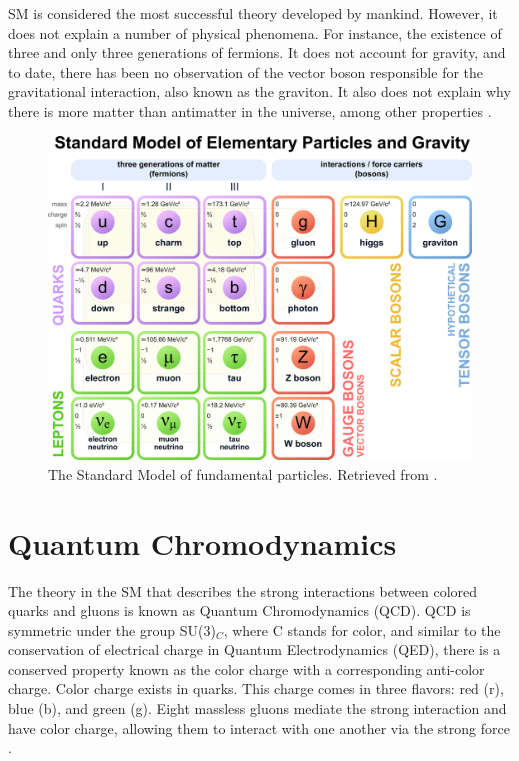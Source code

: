 SM is considered the most successful theory developed by mankind. However, it does not explain a number of physical phenomena. For instance, the existence of three and only three generations of fermions. It does not account for gravity, and to date, there has been no observation of the vector boson responsible for the gravitational interaction, also known as the graviton. It also does not explain why there is more matter than antimatter in the universe, among other properties \cite{grummer2021search, danilov2020measurement}.
\begin{figure}[htp!]
	\centering
	\includegraphics[scale=0.34]{MainContent/Figs/SM.eps}
	\caption{The Standard Model of fundamental particles. Retrieved from \cite{danilov2020measurement}.}
	\label{fig:sm}
\end{figure}

\section{Quantum Chromodynamics}
The theory in the SM that describes the strong interactions between colored quarks and gluons is known as Quantum Chromodynamics (QCD). QCD is symmetric under the group SU(3)$_C$, where C stands for color, and similar to the conservation of electrical charge in Quantum Electrodynamics (QED), there is a conserved property known as the color charge with a corresponding anti-color charge. Color charge exists in quarks. This charge comes in three flavors: red (r), blue (b), and green (g). Eight massless gluons mediate the strong interaction and have color charge, allowing them to interact with one another via the strong force \cite{stiller2016full, di2020measurement, thomson2013modern}.

